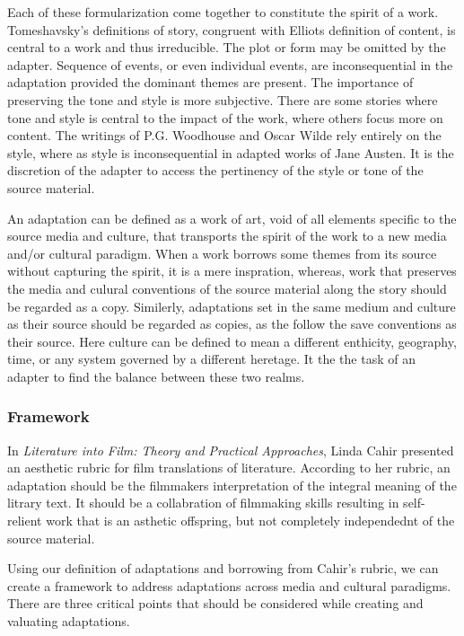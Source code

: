 \documentclass[12pt]{article}
\begin{document}
Each of these formularization come together to constitute the spirit of a work.
Tomeshavsky's definitions of story, congruent with Elliots definition of
content, is central to a work and thus irreducible. The plot or form may be omitted by the
adapter. Sequence of events, or even individual events, are inconsequential in the
adaptation provided the dominant themes are present. The importance of
preserving the tone and style is more subjective. There are some stories where
tone and style is central to the impact of the work, where others focus more on
content. The writings of P.G. Woodhouse and Oscar Wilde rely entirely on the style, where as
style is inconsequential in adapted works of Jane Austen. It is the discretion of
the adapter to access the pertinency of the style or tone of the source material.

An adaptation can be defined as a work of art, void of all elements specific to
the source media and culture, that transports the spirit of the work to a new
media and/or cultural paradigm. When a work borrows some themes from its source
without capturing the spirit, it is a mere inspration, whereas, work that
preserves the media and culural conventions of the source material along the story should
be regarded as a copy. Similerly, adaptations set in the same medium and culture
as their source should be regarded as copies, as the follow the save conventions
as their source. Here culture can be defined to mean a different enthicity,
geography, time, or any system governed by a different heretage. 
It the the task of an adapter to find the balance between
these two realms.
\pagebreak
\subsubsection*{Framework}

In \textit{Literature into Film: Theory and Practical Approaches}, Linda Cahir 
presented an aesthetic rubric for film translations of literature. According to
her rubric, an adaptation should be the filmmakers interpretation of the integral 
meaning of the litrary text. It should be a collabration of filmmaking skills
resulting in self-relient work that is an asthetic offspring, but not completely
independednt of the source material.


Using our definition of adaptations and borrowing from Cahir's rubric, we can
create a framework to address adaptations across media and cultural paradigms. 
There are three critical points that should be considered while creating and
valuating adaptations. 
\end{document}
